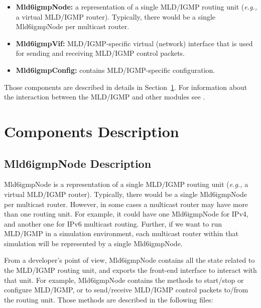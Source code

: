 \documentclass[11pt]{article}
\newcommand{\eg}{\emph{e.g.,}\xspace}
\begin{document}
\begin{itemize}

  \item {\bf Mld6igmpNode:} a representation of a single MLD/IGMP routing unit
  (\eg a virtual MLD/IGMP router).
  Typically, there would be a single Mld6igmpNode per multicast router.

  \item {\bf Mld6igmpVif:} MLD/IGMP-specific virtual (network) interface that
  is used for sending and receiving MLD/IGMP control packets.

  \item {\bf Mld6igmpConfig:} contains MLD/IGMP-specific configuration.

\end{itemize}

Those components are described in details in
Section~\ref{sec:components_description}.
For information about the interaction between the MLD/IGMP and other modules
see \cite{xorp:multicast_arch}.

\section{Components Description}
\label{sec:components_description}


\subsection{Mld6igmpNode Description}

Mld6igmpNode is a representation of a single MLD/IGMP routing unit (\eg a
virtual MLD/IGMP router).
Typically, there would be a single Mld6igmpNode per multicast router.
However, in some cases a multicast router may have more than one
routing unit. For example, it could have one Mld6igmpNode for IPv4, and
another one for IPv6 multicast routing. Further, if we want to
run MLD/IGMP in a simulation environment, each multicast router within that
simulation will be represented by a single Mld6igmpNode.

From a developer's point of view, Mld6igmpNode contains all the state
related to the MLD/IGMP routing unit, and exports the front-end interface
to interact with that unit.
For example, Mld6igmpNode contains the methods to
start/stop or configure MLD/IGMP, or to send/receive MLD/IGMP control packets
to/from the routing unit. Those methods are described in the following files:
\end{document}
